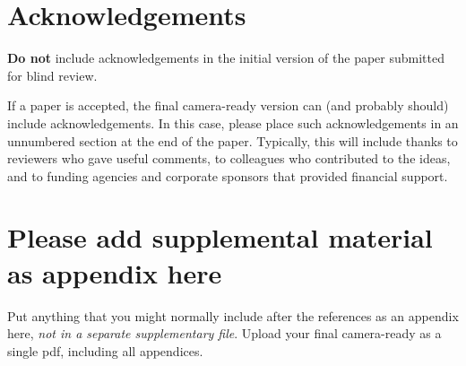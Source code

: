 \documentclass{article}
\begin{document}
\section*{Acknowledgements}

\textbf{Do not} include acknowledgements in the initial version of
the paper submitted for blind review.

If a paper is accepted, the final camera-ready version can (and
probably should) include acknowledgements. In this case, please
place such acknowledgements in an unnumbered section at the
end of the paper. Typically, this will include thanks to reviewers
who gave useful comments, to colleagues who contributed to the ideas,
and to funding agencies and corporate sponsors that provided financial
support.


\nocite{langley00}





\appendix
\section{Please add supplemental material as appendix here}
%
Put anything that you might normally include after the references as an appendix here, {\it not in a separate supplementary file}. Upload your final camera-ready as a single pdf, including all appendices.

\end{document}

